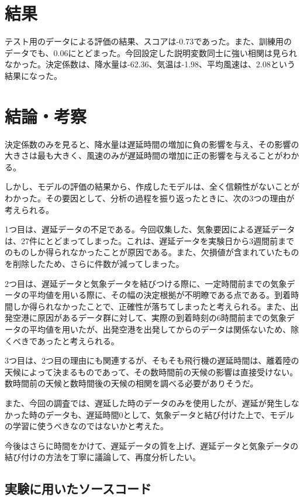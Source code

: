\documentclass[12pt,a4paper,dvipdfmx,titlepage]{jsarticle}
\begin{document}
\section*{結果}
テスト用のデータによる評価の結果、スコアは-0.73であった。また、訓練用のデータでも、0.06にとどまった。今回設定した説明変数同士に強い相関は見られなかった。決定係数は、降水量は-62.36、気温は-1.98、平均風速は、2.08という結果になった。

\section*{結論・考察}
決定係数のみを見ると、降水量は遅延時間の増加に負の影響を与え、その影響の大きさは最も大きく、風速のみが遅延時間の増加に正の影響を与えることがわかる。

しかし、モデルの評価の結果から、作成したモデルは、全く信頼性がないことがわかった。その要因として、分析の過程を振り返ったときに、次の3つの理由が考えられる。

1つ目は、遅延データの不足である。今回収集した、気象要因による遅延データは、27件にとどまってしまった。これは、遅延データを実験日から3週間前までのものしか得られなかったことが原因である。また、欠損値が含まれていたものを削除したため、さらに件数が減ってしまった。

2つ目は、遅延データと気象データを結びつける際に、一定時間前までの気象データの平均値を用いる際に、その幅の決定根拠が不明瞭である点である。到着時間しか得られなかったことで、正確性が落ちてしまったと考えられる。また、出発空港に原因があるデータ群に対して、実際の到着時刻の6時間前までの気象データの平均値を用いたが、出発空港を出発してからのデータは関係ないため、除くべきであったと考えられる。

3つ目は、2つ目の理由にも関連するが、そもそも飛行機の遅延時間は、離着陸の天候によって決まるものであって、その数時間前の天候の影響は直接受けない\cite{delayReason}。数時間前の天候と数時間後の天候の相関を調べる必要がありそうだ。

また、今回の調査では、遅延した時のデータのみを使用したが、遅延が発生しなかった時のデータも、遅延時間0として、気象データと結び付けた上で、モデルの学習に使うべきなのではないかと考えた。

今後はさらに時間をかけて、遅延データの質を上げ、遅延データと気象データの結び付けの方法を丁寧に議論して、再度分析したい。

\pagebreak



\pagebreak

\begin{appendix}

\section*{実験に用いたソースコード}


\end{appendix}
\end{document}
